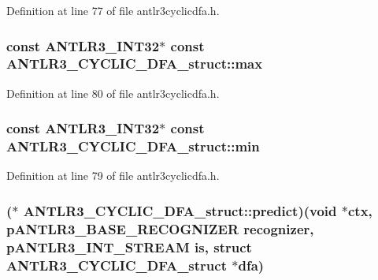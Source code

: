 Definition at line 77 of file antlr3cyclicdfa.\-h.

\hypertarget{struct_a_n_t_l_r3___c_y_c_l_i_c___d_f_a__struct_a74ba5647cc06f823e28ab0eda1bb7c0d}{
\subsubsection[{max}]{\setlength{\rightskip}{0pt plus 5cm}const {\bf A\-N\-T\-L\-R3\-\_\-\-I\-N\-T32}$\ast$ const A\-N\-T\-L\-R3\-\_\-\-C\-Y\-C\-L\-I\-C\-\_\-\-D\-F\-A\-\_\-struct\-::max}}\label{struct_a_n_t_l_r3___c_y_c_l_i_c___d_f_a__struct_a74ba5647cc06f823e28ab0eda1bb7c0d}


Definition at line 80 of file antlr3cyclicdfa.\-h.

\hypertarget{struct_a_n_t_l_r3___c_y_c_l_i_c___d_f_a__struct_ad4f7b98244ffc38a190b39f84d25915e}{
\subsubsection[{min}]{\setlength{\rightskip}{0pt plus 5cm}const {\bf A\-N\-T\-L\-R3\-\_\-\-I\-N\-T32}$\ast$ const A\-N\-T\-L\-R3\-\_\-\-C\-Y\-C\-L\-I\-C\-\_\-\-D\-F\-A\-\_\-struct\-::min}}\label{struct_a_n_t_l_r3___c_y_c_l_i_c___d_f_a__struct_ad4f7b98244ffc38a190b39f84d25915e}


Definition at line 79 of file antlr3cyclicdfa.\-h.

\hypertarget{struct_a_n_t_l_r3___c_y_c_l_i_c___d_f_a__struct_a60d5596e45bd13aec491f2a789832305}{
\subsubsection[{predict}]{($\ast$ A\-N\-T\-L\-R3\-\_\-\-C\-Y\-C\-L\-I\-C\-\_\-\-D\-F\-A\-\_\-struct\-::predict)(void $\ast$ctx, {\bf p\-A\-N\-T\-L\-R3\-\_\-\-B\-A\-S\-E\-\_\-\-R\-E\-C\-O\-G\-N\-I\-Z\-E\-R} recognizer, {\bf p\-A\-N\-T\-L\-R3\-\_\-\-I\-N\-T\-\_\-\-S\-T\-R\-E\-A\-M} is, struct {\bf A\-N\-T\-L\-R3\-\_\-\-C\-Y\-C\-L\-I\-C\-\_\-\-D\-F\-A\-\_\-struct} $\ast$dfa)}}\label{struct_a_n_t_l_r3___c_y_c_l_i_c___d_f_a__struct_a60d5596e45bd13aec491f2a789832305}


